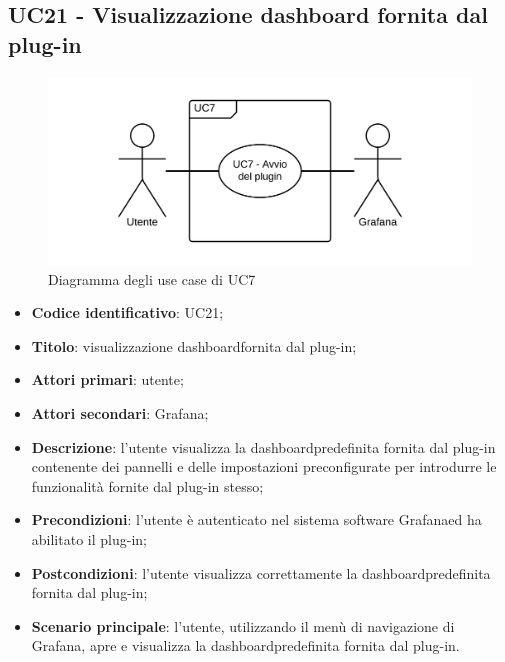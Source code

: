 \subsection{UC21 - Visualizzazione dashboard fornita dal plug-in}
\begin{figure}[H]
	\includegraphics{img/UC7_-_Avvio_plugin.png}
	\caption{Diagramma degli use case di UC7}
\end{figure}
\begin{itemize}
	\item \textbf{Codice identificativo}: UC21;
	\item \textbf{Titolo}: visualizzazione dashboard\glosp fornita dal plug-in;
	\item \textbf{Attori primari}: utente;
	\item \textbf{Attori secondari}: Grafana\glo;
	\item \textbf{Descrizione}: l'utente visualizza la dashboard\glosp predefinita fornita dal plug-in contenente dei pannelli e delle impostazioni preconfigurate per introdurre le funzionalità fornite dal plug-in stesso;
	\item \textbf{Precondizioni}: l'utente è autenticato nel sistema software Grafana\glosp ed ha abilitato il plug-in;
	\item \textbf{Postcondizioni}: l'utente visualizza correttamente la dashboard\glosp predefinita fornita dal plug-in;
	\item \textbf{Scenario principale}: l'utente, utilizzando il menù di navigazione di Grafana\glo, apre e visualizza la dashboard\glosp predefinita fornita dal plug-in.
\end{itemize} 
